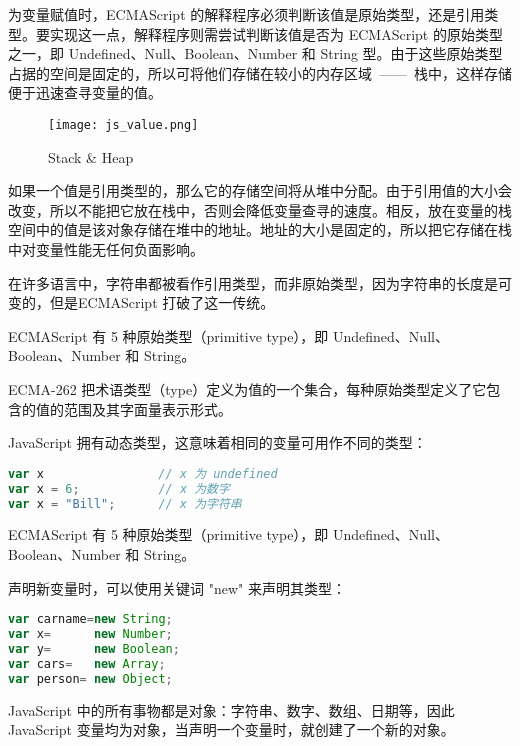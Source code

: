 为变量赋值时，ECMAScript 的解释程序必须判断该值是原始类型，还是引用类型。要实现这一点，解释程序则需尝试判断该值是否为 ECMAScript 的原始类型之一，即 Undefined、Null、Boolean、Number 和 String 型。由于这些原始类型占据的空间是固定的，所以可将他们存储在较小的内存区域~——~栈中，这样存储便于迅速查寻变量的值。


\begin{figure}[!h]
\centering
\texttt{[image: js\_value.png]}
\vspace{-10pt}
\caption{Stack \& Heap}
\label{stack_heap}
\end{figure}

如果一个值是引用类型的，那么它的存储空间将从堆中分配。由于引用值的大小会改变，所以不能把它放在栈中，否则会降低变量查寻的速度。相反，放在变量的栈空间中的值是该对象存储在堆中的地址。地址的大小是固定的，所以把它存储在栈中对变量性能无任何负面影响。

在许多语言中，字符串都被看作引用类型，而非原始类型，因为字符串的长度是可变的，但是ECMAScript 打破了这一传统。

ECMAScript 有 5 种原始类型（primitive type），即 Undefined、Null、Boolean、Number 和 String。

ECMA-262 把术语类型（type）定义为值的一个集合，每种原始类型定义了它包含的值的范围及其字面量表示形式。




JavaScript 拥有动态类型，这意味着相同的变量可用作不同的类型：

\begin{lstlisting}[language=JavaScript]
var x                // x 为 undefined
var x = 6;           // x 为数字
var x = "Bill";      // x 为字符串
\end{lstlisting}

ECMAScript 有 5 种原始类型（primitive type），即 Undefined、Null、Boolean、Number 和 String。

声明新变量时，可以使用关键词 "new" 来声明其类型：

\begin{lstlisting}[language=JavaScript]
var carname=new String;
var x=      new Number;
var y=      new Boolean;
var cars=   new Array;
var person= new Object;
\end{lstlisting}

JavaScript 中的所有事物都是对象：字符串、数字、数组、日期等，因此JavaScript 变量均为对象，当声明一个变量时，就创建了一个新的对象。












